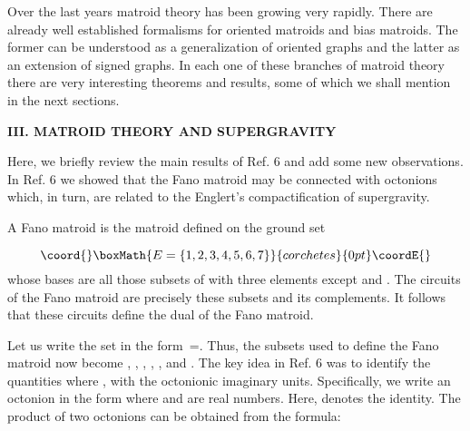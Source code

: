 \documentclass[a4paper,12pt]{article}
\begin{document}
Over the last years matroid theory has been growing very rapidly. There are
already well established formalisms for oriented matroids\coordHE{} and bias
matroids.\coordHE{} The former can be understood as a generalization of
oriented graphs and the latter as an extension of signed graphs. In each one
of these branches of matroid theory there are very interesting theorems and
results, some of which we shall mention in the next sections.

\bigskip

\smallskip

\noindent \textbf{III. MATROID THEORY AND SUPERGRAVITY}

\bigskip

Here, we briefly review the main results of Ref. 6 and add some new
observations. In Ref. 6 we showed that the Fano matroid \coordHE{}may be
connected with octonions which, in turn, are related to the Englert's
compactification of \coordHE{} supergravity.

A Fano matroid \coordHE{} is the matroid defined on the ground set

\[\coord{}\boxMath{
E=\{1,2,3,4,5,6,7\} 
}{corchetes}{0pt}\coordE{}\]
whose bases are all those subsets of \coordHE{} with three elements except \coordHE{}  \coordHE{}  \coordHE{}  \coordHE{}  \coordHE{}  \coordHE{} and \coordHE{}. The circuits of
the Fano matroid are precisely these subsets and its complements. It follows
that these circuits define the dual \coordHE{} of the Fano matroid.

Let us write the set \coordHE{} in the form\textit{\ }\coordHE{}=\coordHE{}. Thus, the subsets used to
define the Fano matroid now become \coordHE{}, \coordHE{}, \coordHE{}, \coordHE{}, \coordHE{}, \coordHE{} and \coordHE{}. The key idea
in Ref. 6 was to identify the quantities \coordHE{} where \coordHE{},\coordHE{} with
the octonionic imaginary units. Specifically, we write an octonion \coordHE{} in
the form \coordHE{} where \coordHE{} and \coordHE{} are real numbers. Here, \coordHE{} denotes the
identity. The product of two octonions can be obtained from the formula:
\end{document}

